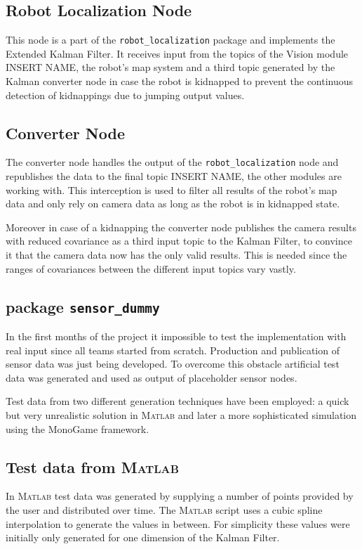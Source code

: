 \subsection{Robot Localization Node}
This node is a part of the \texttt{robot\_localization} package and implements the Extended Kalman Filter. It receives input from the topics of the Vision module INSERT NAME, the robot's map system and a third topic generated by the Kalman converter node in case the robot is kidnapped to prevent the continuous detection of kidnappings due to jumping output values.

\subsection{Converter Node}
The converter node handles the output of the \texttt{robot\_localization} node and republishes the data to the final topic INSERT NAME, the other modules are working with. This interception is used to filter all results of the robot's map data and only rely on camera data as long as the robot is in kidnapped state.

Moreover in case of a kidnapping the converter node publishes the camera results with reduced covariance as a third input topic to the Kalman Filter, to convince it that the camera data now has the only valid results. This is needed since the ranges of covariances between the different input topics vary vastly.

\subsection{package \texttt{sensor\_dummy}}
In the first months of the project it impossible to test the implementation with real input since all teams started from scratch. Production and publication of sensor data was just being developed. To overcome this obstacle artificial test data was generated and used as output of placeholder sensor nodes. 

Test data from two different generation techniques have been employed: a quick but very unrealistic solution in \textsc{Matlab} and later a more sophisticated simulation using the MonoGame framework.

\subsection{Test data from \textsc{Matlab}}
In \textsc{Matlab} test data was generated by supplying a number of points provided by the user and distributed over time. The \textsc{Matlab} script uses a cubic spline interpolation to generate the values in between. For simplicity these values were initially only generated for one dimension of the Kalman Filter.

